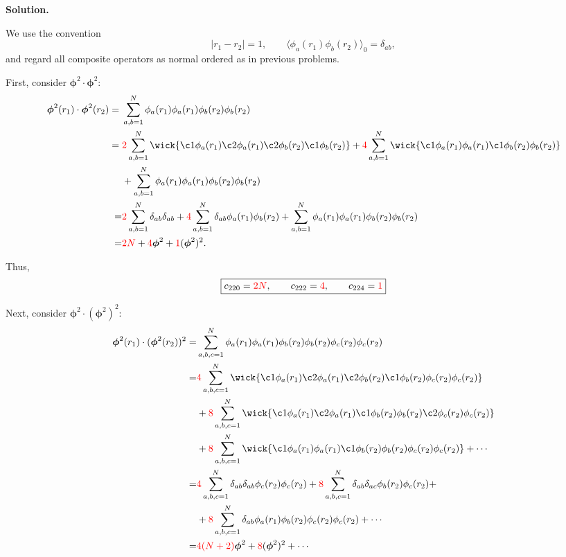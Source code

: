 \documentclass[11pt,a4paper]{article}
\newcounter{problem}
\newcounter{saveequation}
\newenvironment{solution}
{
	\par
	\setcounter{saveequation}{\value{equation}}
	\begingroup
	\setcounter{equation}{0}
	\renewcommand{\theequation}{\arabic{problem}.\arabic{equation}}
	\renewcommand{\theHequation}{sol.\arabic{problem}.\arabic{equation}}
	\noindent\textbf{Solution.}\quad
}
{
	\par
	\endgroup
	\setcounter{equation}{\value{saveequation}}
}
\begin{document}
	\begin{solution}
		We use the convention
		\[
		|r_1-r_2|=1,
		\qquad
		\langle\phi_a(r_1)\phi_b(r_2)\rangle_0=\delta_{ab},
		\]
		and regard all composite operators as normal ordered as in previous problems.
		
		First, consider $\boldsymbol{\phi}^2\cdot\boldsymbol{\phi}^2$:
		\begin{align*}
			\boldsymbol{\phi}^2(r_1)\cdot\boldsymbol{\phi}^2(r_2)
			={}&
			\sum_{a,b=1}^{N}
			\phi_a(r_1)\phi_a(r_1)
			\phi_b(r_2)\phi_b(r_2)
			\\
			={}&
			\textcolor{red}{2}
			\sum_{a,b=1}^{N}
			\wick{
				\c1\phi_a(r_1)\c2\phi_a(r_1)
				\c2\phi_b(r_2)\c1\phi_b(r_2)
			}
			+
			\textcolor{red}{4}
			\sum_{a,b=1}^{N}
			\wick{
				\c1\phi_a(r_1)\phi_a(r_1)
				\c1\phi_b(r_2)\phi_b(r_2)
			}
			\\
			&+
			\sum_{a,b=1}^{N}
			\phi_a(r_1)\phi_a(r_1)
			\phi_b(r_2)\phi_b(r_2)
			\\
			=&\textcolor{red}{2}
			\sum_{a,b=1}^{N}\delta_{ab}\delta_{ab}+	\textcolor{red}{4}
			\sum_{a,b=1}^{N}
			\delta_{ab}\phi_a(r_1)\phi_b(r_2)+
			\sum_{a,b=1}^{N}
			\phi_a(r_1)\phi_a(r_1)
			\phi_b(r_2)\phi_b(r_2)
			\\
			=&
			\textcolor{red}{2N}
			+
			\textcolor{red}{4}\boldsymbol{\phi}^2
			+
			\textcolor{red}{1}(\boldsymbol{\phi}^2)^2.
		\end{align*}

		Thus,
		\[
		\boxed{
		c_{220}=\textcolor{red}{2N},
		\qquad
		c_{222}=\textcolor{red}{4},
		\qquad
		c_{224}=\textcolor{red}{1}
		}
		\]
		
		Next, consider $\boldsymbol{\phi}^2\cdot(\boldsymbol{\phi}^2)^2$:
			\begin{align*}
				\boldsymbol{\phi}^2(r_1)\cdot(\boldsymbol{\phi}^2(r_2))^2
				=&
				\sum_{a,b,c=1}^{N}
				\phi_a(r_1)\phi_a(r_1)
				\phi_b(r_2)\phi_b(r_2)
				\phi_c(r_2)\phi_c(r_2)\\
				=&
				\textcolor{red}{4}
				\sum_{a,b,c=1}^{N}
				\wick{
					\c1\phi_a(r_1)\c2\phi_a(r_1)
					\c2\phi_b(r_2)\c1\phi_b(r_2)
					\phi_c(r_2)\phi_c(r_2)
				}
				\\&+
				\textcolor{red}{8}
				\sum_{a,b,c=1}^{N}
				\wick{
					\c1\phi_a(r_1)\c2\phi_a(r_1)
					\c1\phi_b(r_2)\phi_b(r_2)
					\c2\phi_c(r_2)\phi_c(r_2)
				}
				\\
				&+\textcolor{red}{8}
				\sum_{a,b,c=1}^{N}
				\wick{
					\c1\phi_a(r_1)\phi_a(r_1)
					\c1\phi_b(r_2)\phi_b(r_2)
					\phi_c(r_2)\phi_c(r_2)
				}+\cdots\\
				=&
				\textcolor{red}{4}
				\sum_{a,b,c=1}^{N}
				\delta_{ab}\delta_{ab}\phi_c(r_2)\phi_c(r_2)+\textcolor{red}{8}
				\sum_{a,b,c=1}^{N}
				\delta_{ab}\delta_{ac}
				\phi_b(r_2)\phi_c(r_2)+	
				\\&+\textcolor{red}{8}
				\sum_{a,b,c=1}^{N}
				\delta_{ab}
				\phi_a(r_1)\phi_b(r_2)
				\phi_c(r_2)\phi_c(r_2)+\cdots\\
				=&\textcolor{red}{4(N+2)}\boldsymbol{\phi}^2+\textcolor{red}{8}(\boldsymbol{\phi}^2)^2
				+\cdots
			\end{align*}
		

\end{solution}
\end{document}
